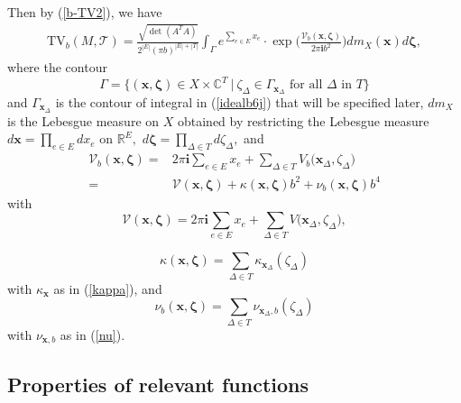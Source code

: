 \documentclass[11pt]{article}
\theoremstyle{remark}
\theoremstyle{remark}
\numberwithin{equation}{section}
\begin{document}
Then by (\ref{b-TV2}),  we have
\begin{equation}\label{TVint}
\begin{split}
\mathrm{TV}_b(M,\mathcal T)= \frac{\sqrt{\det(A^TA)}}{2^{|E|}(\pi b )^{|E|+|T|}}
\int_{\Gamma} e^{\sum_{e\in E}x_e}\cdot\exp\Bigg(\frac{\mathcal V_b(\boldsymbol x, \boldsymbol \zeta)}{2\pi \mathbf i b^2}\Bigg)dm_X(\boldsymbol x)  d \boldsymbol \zeta,
\end{split}
\end{equation}
where the contour 
$$\Gamma=  \bigg\{ (\boldsymbol x,\boldsymbol \zeta)\in X \times \mathbb C^T   \ \bigg|\ \zeta_\Delta\in\Gamma_{\boldsymbol x_\Delta} \text{ for all }\Delta\text{ in }T\bigg\}$$
and $\Gamma_{\boldsymbol x_\Delta}$ is the contour of integral in (\ref{idealb6j}) that 
 will be specified later, $dm_X$ is the Lebesgue measure on $X$ obtained by restricting the Lebesgue measure $d\boldsymbol x=\prod _{e\in E}dx_e$ on $\mathbb R^E,$ $d\boldsymbol \zeta=\prod _{\Delta\in T}d\zeta_\Delta,$ and
\begin{equation}\label{Wnu}
\begin{split}
\mathcal V_b(\boldsymbol x, \boldsymbol \zeta)=&2\pi\mathbf i \sum_{e\in E}x_e+\sum_{\Delta\in T}V_b\big(\boldsymbol x_\Delta,\zeta_\Delta\big)\\
=&\mathcal V(\boldsymbol x, \boldsymbol \zeta)+\kappa(\boldsymbol x,\boldsymbol \zeta)b^2+\nu_b(\boldsymbol x,\boldsymbol \zeta)b^4
\end{split}
\end{equation}
with
\begin{equation}\label{calV}
    \mathcal V(\boldsymbol x, \boldsymbol \zeta)=2\pi \mathbf i \sum_{e\in E}x_e+\sum_{\Delta\in T}V\big(\boldsymbol x_\Delta,\zeta_\Delta\big),
\end{equation}

 $$\kappa(\boldsymbol x,\boldsymbol\zeta)=\sum_{\Delta\in T}\kappa_{\boldsymbol x_\Delta}(\zeta_\Delta)$$
 with $\kappa_{\boldsymbol x}$ as in (\ref{kappa}),  and $$\nu_b(\boldsymbol x,\boldsymbol\zeta)=\sum_{\Delta\in T}\nu_{\boldsymbol x_\Delta,b}(\zeta_\Delta)$$  with  $\nu_{\boldsymbol x,b}$  as in (\ref{nu}). 



\subsection{Properties of relevant functions}
\end{document}
